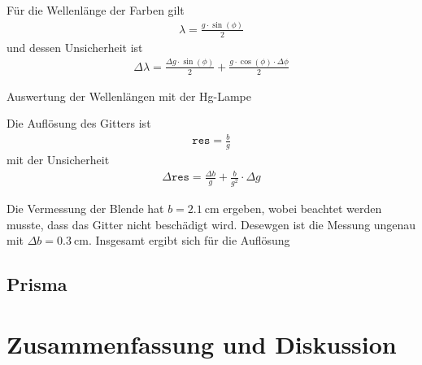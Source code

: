 \documentclass{article}
\begin{document}
Für die Wellenlänge der Farben gilt
\begin{align*}
\lambda = \frac{g\cdot \sin(\phi)}{2}
\end{align*}
und dessen Unsicherheit ist
\begin{align*}
\Delta \lambda = \frac{\Delta g\cdot \sin(\phi)}{2} + \frac{g\cdot \cos(\phi)\cdot \Delta\phi}{2}
\end{align*}



\begin{table}[H]
\caption{Auswertung der Wellenlängen mit der Hg-Lampe}
\label{tab:hg_lampe_auswertung}
\centering

\end{table}


Die Auflösung des Gitters ist
\begin{align*}
\texttt{res} = \frac{b}{g} 
\end{align*}
mit der Unsicherheit
\begin{align*}
\Delta\texttt{res} = \frac{\Delta b}{g} + \frac{b}{g^2}\cdot\Delta g
\end{align*}

Die Vermessung der Blende hat $b=2.1~$cm ergeben, wobei beachtet werden musste, dass das Gitter nicht beschädigt wird. Desewgen ist die Messung ungenau mit $\Delta b = 0.3~$cm.
Insgesamt ergibt sich für die Auflösung



\subsection{Prisma}

\section{Zusammenfassung und Diskussion}







%

%


%
\end{document}
